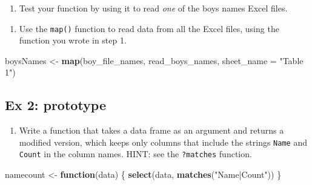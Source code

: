\documentclass[]{book}
\newenvironment{Shaded}{\begin{snugshade}}{\end{snugshade}}
\newcommand{\KeywordTok}[1]{\textcolor[rgb]{0.13,0.29,0.53}{\textbf{#1}}}
\newcommand{\DataTypeTok}[1]{\textcolor[rgb]{0.13,0.29,0.53}{#1}}
\newcommand{\DecValTok}[1]{\textcolor[rgb]{0.00,0.00,0.81}{#1}}
\newcommand{\StringTok}[1]{\textcolor[rgb]{0.31,0.60,0.02}{#1}}
\newcommand{\ControlFlowTok}[1]{\textcolor[rgb]{0.13,0.29,0.53}{\textbf{#1}}}
\newcommand{\OperatorTok}[1]{\textcolor[rgb]{0.81,0.36,0.00}{\textbf{#1}}}
\newcommand{\NormalTok}[1]{#1}
\providecommand{\tightlist}{%
  \setlength{\itemsep}{0pt}\setlength{\parskip}{0pt}}
\begin{document}
\begin{enumerate}
\def\labelenumi{\arabic{enumi}.}
\setcounter{enumi}{1}
\tightlist
\item
  Test your function by using it to read \emph{one} of the boys names
  Excel files.
\end{enumerate}

\begin{Shaded}
\end{Shaded}

\begin{enumerate}
\def\labelenumi{\arabic{enumi}.}
\setcounter{enumi}{2}
\tightlist
\item
  Use the \texttt{map()} function to read data from all the Excel files,
  using the function you wrote in step 1.
\end{enumerate}

\begin{Shaded}
\begin{Highlighting}[]
\NormalTok{boysNames <-}\StringTok{ }\KeywordTok{map}\NormalTok{(boy_file_names, read_boys_names, }\DataTypeTok{sheet_name =} \StringTok{"Table 1"}\NormalTok{)}
\end{Highlighting}
\end{Shaded}

\subsection{Ex 2: prototype}\label{ex-2-prototype-2}

\begin{enumerate}
\def\labelenumi{\arabic{enumi}.}
\tightlist
\item
  Write a function that takes a data frame as an argument and returns a
  modified version, which keeps only columns that include the strings
  \texttt{Name} and \texttt{Count} in the column names. HINT: see the
  \texttt{?matches} function.
\end{enumerate}

\begin{Shaded}
\begin{Highlighting}[]
\NormalTok{  namecount <-}\StringTok{ }\ControlFlowTok{function}\NormalTok{(data) \{}
      \KeywordTok{select}\NormalTok{(data, }\KeywordTok{matches}\NormalTok{(}\StringTok{"Name|Count"}\NormalTok{))}
\NormalTok{  \}}
\end{Highlighting}
\end{Shaded}
\end{document}
